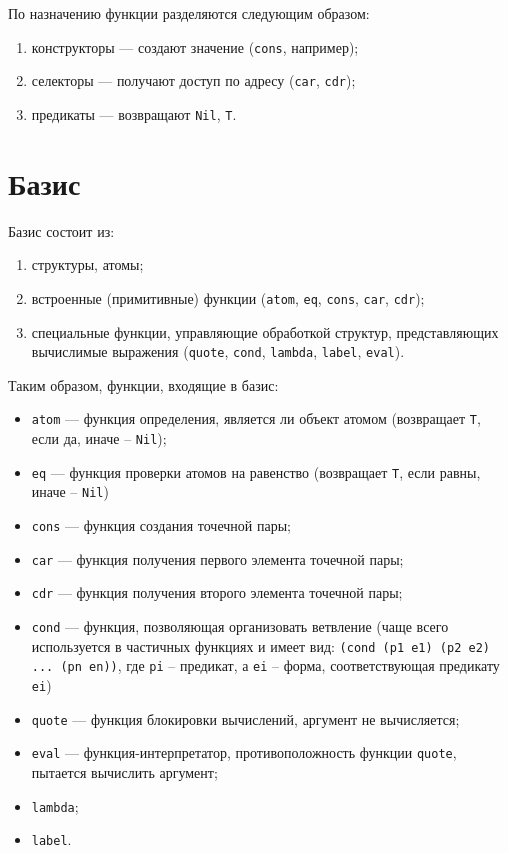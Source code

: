 По назначению функции разделяются следующим образом:

\begin{enumerate}
    \item конструкторы --- создают значение (\texttt{cons}, например);
    \item селекторы --- получают доступ по адресу (\texttt{car}, \texttt{cdr});
    \item предикаты --- возвращают \texttt{Nil}, \texttt{T}.
\end{enumerate}

\section{Базис}

Базис состоит из:
\begin{enumerate}
    \item структуры, атомы;
    \item встроенные (примитивные) функции (\texttt{atom}, \texttt{eq}, \texttt{cons}, \texttt{car}, \texttt{cdr});
    \item специальные функции, управляющие обработкой структур, представляющих вычислимые выражения (\texttt{quote}, \texttt{cond}, \texttt{lambda}, \texttt{label}, \texttt{eval}).
\end{enumerate}

Таким образом, функции, входящие в базис:
\begin{itemize}
    \item \texttt{atom} --- функция определения, является ли объект атомом (возвращает \texttt{T}, если да, иначе -- \texttt{Nil});
    \item \texttt{eq} --- функция проверки атомов на равенство (возвращает \texttt{T}, если равны, иначе -- \texttt{Nil})
    \item \texttt{cons} --- функция создания точечной пары;
    \item \texttt{car} --- функция получения первого элемента точечной пары;
    \item \texttt{cdr} --- функция получения второго элемента точечной пары;
    \item \texttt{cond} --- функция, позволяющая организовать ветвление (чаще всего используется в частичных функциях и имеет вид: \texttt{(cond (p1 e1) (p2 e2) ... (pn en))}, где \texttt{pi} -- предикат, а \texttt{ei} -- форма, соответствующая предикату \texttt{ei})
    \item \texttt{quote} --- функция блокировки вычислений, аргумент не вычисляется;
    \item \texttt{eval} --- функция-интерпретатор, противоположность функции \texttt{quote}, пытается вычислить аргумент;
    \item \texttt{lambda};
    \item \texttt{label}.
\end{itemize}

